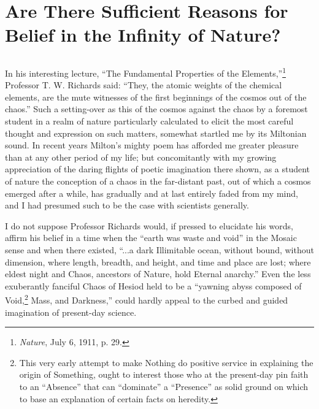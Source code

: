 \documentclass[a4paper, 11pt, oneside, polutonikogreek, english]{article}
\begin{document}
\section{Are There Sufficient Reasons for Belief in the Infinity of Nature?}
\subsection{}
\paragraph{}
In his interesting lecture, ``The Fundamental Properties of the Elements,''\footnote{\emph{Nature}, July 6, 1911, p. 29.} Professor T. W. Richards said: ``They, the atomic weights of the chemical elements, are the mute witnesses of the first beginnings of the cosmos out of the chaos.'' Such a setting-over as this of the cosmos against the chaos by a foremost student in a realm of nature particularly calculated to elicit the most careful thought and expression on such matters, somewhat startled me by its Miltonian sound. In recent years Milton's mighty poem has afforded me greater pleasure than at any other period of my life; but concomitantly with my growing appreciation of the daring flights of poetic imagination there shown, as a student of nature the conception of a chaos in the far-distant past, out of which a cosmos emerged after a while, has gradually and at last entirely faded from my mind, and I had presumed such to be the case with scientists generally. 

I do not suppose Professor Richards would, if pressed to elucidate his words, affirm his belief in a time when the ``earth was waste and void'' in the Mosaic sense and when there existed, ``...a dark Illimitable ocean, without bound, without dimension, where length, breadth, and height, and time and place are lost; where eldest night and Chaos, ancestors of Nature, hold Eternal anarchy.'' Even the less exuberantly fanciful Chaos of Hesiod held to be a ``yawning abyss composed of Void,\footnote{This very early attempt to make Nothing do positive service in explaining the origin of Something, ought to interest those who at the present-day pin faith to an ``Absence'' that can ``dominate'' a ``Presence'' as solid ground on which to base an explanation of certain facts on heredity.} Mass, and Darkness,'' could hardly appeal to the curbed and guided imagination of present-day science.
\end{document}
